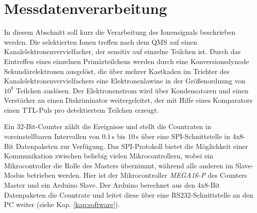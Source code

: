\section{Messdatenverarbeitung}\label{sec:messdatenverarbeitung}
In diesem Abschnitt soll kurz die Verarbeitung des Ionensignals beschrieben
werden. Die selektierten Ionen treffen nach dem QMS auf einen
Kanalelektronenvervielfacher, der sensitiv auf einzelne Teilchen ist. Durch das
Eintreffen eines einzelnen Primärteilchens werden durch eine Konversionsdynode
Sekundärelektronen ausgelöst, die über mehrer Kastkaden im Trichter des
Kanalelektronenvervielfachers eine Elektronenlawine in der Größenordnung von
$10^8$ Teilchen auslösen. Der Elektronenstrom wird über Kondensatoren und einen Verstärker an
einen Diskriminator weitergeleitet, der mit Hilfe eines Komparators einen
TTL-Puls pro detektiertem Teilchen erzeugt.\par
Ein 32-Bit-Counter \cite{counterkarte_countraten} zählt die Ereignisse und
stellt die Countraten in voreinstellbaren Intervallen von $0.1\,$s bis $10\,$s
über eine SPI-Schnittstelle in 4x8-Bit Datenpaketen zur Verfügung. Das SPI-Protokoll bietet die Möglichkeit einer Kommunikation
zwischen beliebig vielen Mikrocontrollern, wobei ein Mikrocontroller die Rolle
des Masters übernimmt, während alle anderen im Slave-Modus betrieben werden.
Hier ist der Mikrocontroller \textit{MEGA16-P} des Counters Master und ein
Arduino Slave. Der Arduino berechnet aus den 4x8-Bit Datenpaketen die Countrate
und leitet diese über eine RS232-Schnittstelle an den PC weiter (siehe Kap.
\ref{kap:software}).

